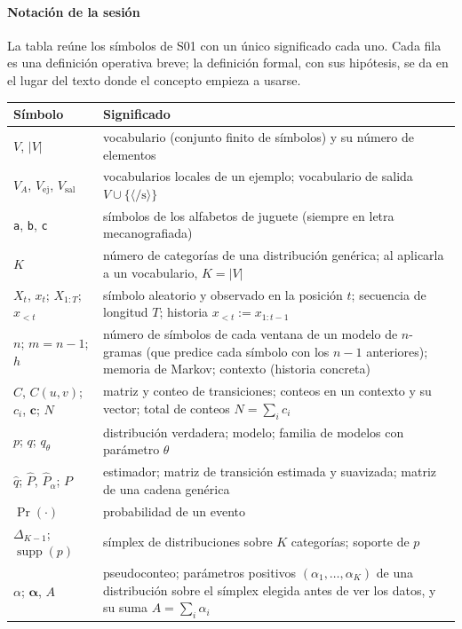 \paragraph{Notación de la sesión}\label{s01:notacion}
La tabla reúne los símbolos de S01 con un único significado cada uno. Cada fila
es una definición operativa breve; la definición formal, con sus hipótesis, se
da en el lugar del texto donde el concepto empieza a usarse.
{\small
\begin{longtable}{@{}>{\raggedright\arraybackslash}p{37mm}>{\raggedright\arraybackslash}p{\dimexpr\textwidth-37mm-2\tabcolsep\relax}@{}}\toprule
Símbolo & Significado\\\midrule
\endhead
$V$, $|V|$ & vocabulario (conjunto finito de símbolos) y su número de elementos\\
$V_A$, $V_{\mathrm{ej}}$, $V_{\mathrm{sal}}$ & vocabularios locales de un ejemplo; vocabulario de salida $V\cup\{\langle/\mathrm s\rangle\}$\\
\texttt{a}, \texttt{b}, \texttt{c} & símbolos de los alfabetos de juguete (siempre en letra mecanografiada)\\
$K$ & número de categorías de una distribución genérica; al aplicarla a un vocabulario, $K=|V|$\\
$X_t$, $x_t$; $X_{1:T}$; $x_{<t}$ & símbolo aleatorio y observado en la posición $t$; secuencia de longitud $T$; historia $x_{<t}:=x_{1:t-1}$\\
$n$; $m=n-1$; $h$ & número de símbolos de cada ventana de un modelo de $n$-gramas (que predice cada símbolo con los $n-1$ anteriores); memoria de Markov; contexto (historia concreta)\\
$C$, $C(u,v)$; $c_i$, $\mathbf c$; $N$ & matriz y conteo de transiciones; conteos en un contexto y su vector; total de conteos $N=\sum_ic_i$\\
$p$; $q$; $q_\theta$ & distribución verdadera; modelo; familia de modelos con parámetro $\theta$\\
$\widehat q$; $\widehat P$, $\widehat P_\alpha$; $P$ & estimador; matriz de transición estimada y suavizada; matriz de una cadena genérica\\
$\Pr(\cdot)$ & probabilidad de un evento\\
$\Delta_{K-1}$; $\operatorname{supp}(p)$ & símplex de distribuciones sobre $K$ categorías; soporte de $p$\\
$\alpha$; $\boldsymbol\alpha$, $A$ & pseudoconteo; parámetros positivos $(\alpha_1,\dots,\alpha_K)$ de una distribución sobre el símplex elegida antes de ver los datos, y su suma $A=\sum_i\alpha_i$\\

\end{longtable}}
